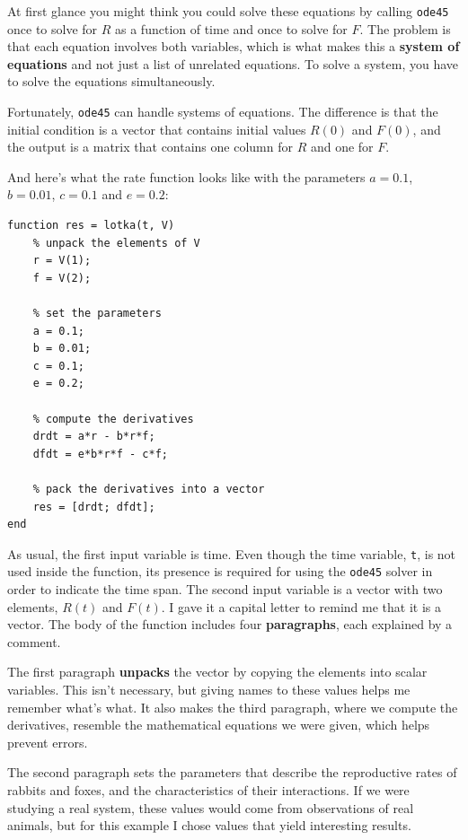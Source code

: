 \documentclass{book}
\begin{document}
At first glance you might think you could solve these equations by
calling {\tt ode45} once to solve for $R$ as a function of time and
once to solve for $F$.  The problem is that each equation involves
both variables, which is what makes this a {\bf system of equations}
and not just a list of unrelated equations.  To solve a system, you
have to solve the equations simultaneously.

Fortunately, {\tt ode45} can handle systems of equations.  The
difference is that the initial condition is a vector that contains
initial values $R(0)$ and $F(0)$, and the output is a matrix
that contains one column for $R$ and one for $F$.

And here's what the rate function looks like
with the parameters $a = 0.1$, $b = 0.01$, $c = 0.1$ and $e = 0.2$:

\begin{verbatim}
function res = lotka(t, V)
    % unpack the elements of V
    r = V(1);
    f = V(2);

    % set the parameters
    a = 0.1;
    b = 0.01;
    c = 0.1;
    e = 0.2;
    
    % compute the derivatives
    drdt = a*r - b*r*f;
    dfdt = e*b*r*f - c*f;
    
    % pack the derivatives into a vector
    res = [drdt; dfdt];
end
\end{verbatim}

As usual, the first input variable is time. 
Even though the time variable, {\tt t}, 
is not used inside the function, its presence is required for 
using the {\tt ode45} solver in order to indicate the time span.
The second input variable is a vector with two elements,
$R(t)$ and $F(t)$.  I gave it a capital letter to remind me that it
is a vector.  The body of the function includes four {\bf paragraphs},
each explained by a comment.

The first paragraph {\bf unpacks} the vector by copying the elements
into scalar variables.  This isn't necessary, but giving names to
these values helps me remember what's what.  It also makes the third
paragraph, where we compute the derivatives, resemble the mathematical
equations we were given, which helps prevent errors.

The second paragraph sets the parameters that describe the
reproductive rates of rabbits and foxes, and the characteristics of
their interactions.  If we were studying a real system, these values
would come from observations of real animals, but for this example
I chose values that yield interesting results.
\end{document}
